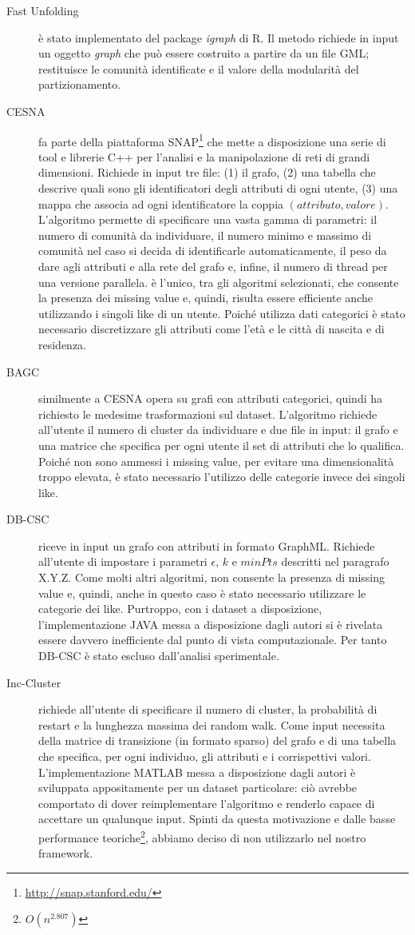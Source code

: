 \begin{description}
\item [Fast Unfolding] \`e stato implementato del package \textit{igraph} di R. Il metodo richiede in input un oggetto \textit{graph} che pu\`o essere costruito a partire da un file GML; restituisce le comunit\`a identificate e il valore della modularit\`a del partizionamento.
\item [CESNA] fa parte della piattaforma SNAP\footnote{\url{http://snap.stanford.edu/}} che mette a disposizione una serie di tool e librerie C++ per l'analisi e la manipolazione di reti di grandi dimensioni. Richiede in input tre file: (1) il grafo, (2) una tabella che descrive quali sono gli identificatori degli attributi di ogni utente, (3) una mappa che associa ad ogni identificatore la coppia $ (attributo, valore) $. L'algoritmo permette di specificare una vasta gamma di parametri: il numero di comunit\`a da individuare, il numero minimo e massimo di comunit\`a nel caso si decida di identificarle automaticamente, il peso da dare agli attributi e alla rete del grafo e, infine, il numero di thread per una versione parallela. \`e l'unico, tra gli algoritmi selezionati, che consente la presenza dei missing value e, quindi, risulta essere efficiente anche utilizzando i singoli like di un utente. Poich\'e utilizza dati categorici \`e stato necessario discretizzare gli attributi come l'et\`a e le citt\`a di nascita e di residenza.
\item[BAGC] similmente a CESNA opera su grafi con attributi categorici, quindi ha richiesto le medesime trasformazioni sul dataset. L'algoritmo richiede all'utente il numero di cluster da individuare e due file in input: il grafo e una matrice che specifica per ogni utente il set di attributi che lo qualifica. Poich\'e non sono ammessi i missing value, per evitare una dimensionalit\`a troppo elevata, \`e stato necessario l'utilizzo delle categorie invece dei singoli like.
\item[DB-CSC] riceve in input un grafo con attributi in formato GraphML. Richiede all'utente di impostare i parametri $ \epsilon $, $ k $ e $ minPts $ descritti nel paragrafo X.Y.Z. Come molti altri algoritmi, non consente la presenza di missing value e, quindi, anche in questo caso \`e stato necessario utilizzare le categorie dei like. Purtroppo, con i dataset a disposizione, l'implementazione JAVA messa a disposizione dagli autori si \`e rivelata essere davvero inefficiente dal punto di vista computazionale. Per tanto DB-CSC \`e stato escluso dall'analisi sperimentale.
\item [Inc-Cluster] richiede all'utente di specificare il numero di cluster, la probabilit\`a di restart e la lunghezza massima dei random walk. Come input necessita della matrice di transizione (in formato sparso) del grafo e di una tabella che specifica, per ogni individuo, gli attributi e i corrispettivi valori. L'implementazione MATLAB messa a disposizione dagli autori \`e sviluppata appositamente per un dataset particolare: ci\`o avrebbe comportato di dover reimplementare l'algoritmo e renderlo capace di accettare un qualunque input. Spinti da questa motivazione e dalle basse performance teoriche\footnote{$ O(n^{2.807}) $}, abbiamo deciso di non utilizzarlo nel nostro framework.

\end{description}

